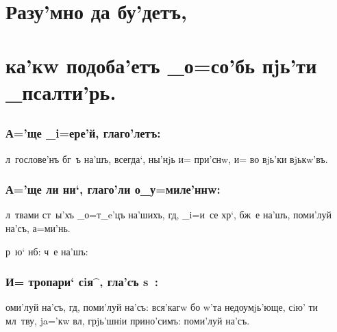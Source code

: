 \documentclass[12pt,twoside,a6paper,xdvi,civil=antiqua]{hipbook}
\begin{document}

\maketitle

\stdsecondpage
\clearpage


\hdrcrosspage

\section{{\Large Разу'мно да бу'детъ,}}
\section[Разу'мно да бу'детъ,]{ка'кw подоба'етъ _о=со'бь пjь'ти _псалти'рь.}
\subsection[ка'кw подоба'етъ _о=со'бь пjь'ти _псалти'рь.]{}
\baselineskip

\subsubsection{А='ще _i=ере'й, глаго'летъ:}

л~гослове'нъ бг~ъ на'шъ, всегда`, ны'нjь и= при'снw, и= во
вjь'ки вjькw'въ.

\subsubsection{А='ще ли ни`, глаго'ли о_у=миле'ннw:}

л~твами ст~ы'хъ _о=т_e'цъ на'шихъ, гд, _i=и~се хр`,
бж~е на'шъ, поми'луй на'съ, а=ми'нь.

р~ю` нб:  ч~е на'шъ:

\subsubsection{И= тропари` сiя^, гла'съ s~:}

оми'луй на'съ, гд, поми'луй на'съ: вся'\-кагw бо w'та
недоумjь'юще, сiю' ти мл~тву, ja='кw вл, грjь'шнiи прино'симъ:
поми'луй на'съ.
\end{document}

